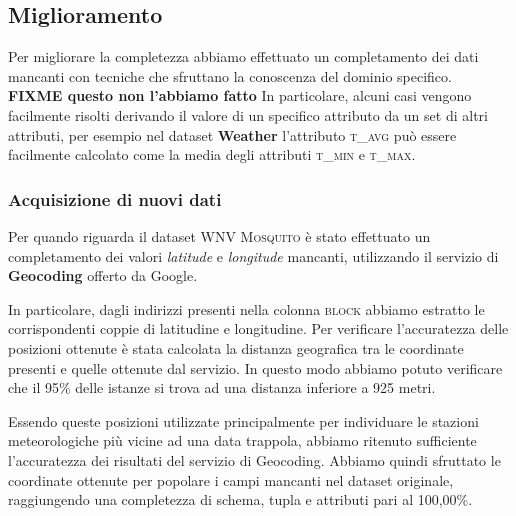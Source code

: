 \subsection{Miglioramento}

Per migliorare la completezza abbiamo effettuato un completamento dei dati 
mancanti con tecniche che sfruttano la conoscenza del dominio specifico.\\
\textbf{FIXME questo non l'abbiamo fatto} In particolare, alcuni casi vengono 
facilmente risolti derivando il valore di un specifico attributo da un set di 
altri attributi, per esempio nel dataset \textbf{Weather} l'attributo 
\textsc{t\_avg} può essere facilmente calcolato come la media degli attributi 
\textsc{t\_min} e \textsc{t\_max}.


\subsubsection{Acquisizione di nuovi dati}
Per quando riguarda il dataset \textsc{WNV Mosquito} è stato effettuato un 
completamento dei valori \textit{latitude} e \textit{longitude} mancanti, 
utilizzando il servizio di \textbf{Geocoding} offerto da Google.

In particolare, dagli indirizzi presenti nella colonna \textsc{block} abbiamo 
estratto le corrispondenti coppie di latitudine e longitudine. 
Per verificare l'accuratezza delle posizioni ottenute è stata calcolata la 
distanza geografica tra le coordinate presenti e quelle ottenute dal servizio. 
In questo modo abbiamo potuto verificare che il 95\% delle istanze si trova ad 
una distanza inferiore a 925 metri.

Essendo queste posizioni utilizzate principalmente per individuare le stazioni 
meteorologiche più vicine ad una data trappola, abbiamo ritenuto sufficiente 
l'accuratezza dei risultati del servizio di Geocoding. Abbiamo quindi sfruttato 
le coordinate ottenute per popolare i campi mancanti nel dataset originale, 
raggiungendo una completezza di schema, tupla e attributi pari al 100,00\%.

